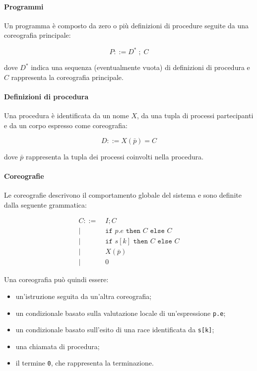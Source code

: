 \paragraph{Programmi}

Un programma è composto da zero o più definizioni di procedure seguite da una coreografia principale:

\[
P ::= D^{*} \; ; \; C
\]

dove \(D^{*}\) indica una sequenza (eventualmente vuota) di definizioni di procedura e \(C\) rappresenta la coreografia principale.

\paragraph{Definizioni di procedura}

Una procedura è identificata da un nome \(X\), da una tupla di processi partecipanti e da un corpo espresso come coreografia:

\[
D ::= X(\bar{p}) = C
\]

dove \(\bar{p}\) rappresenta la tupla dei processi coinvolti nella procedura.

\paragraph{Coreografie}

Le coreografie descrivono il comportamento globale del sistema e sono definite dalla seguente grammatica:

\[
\begin{aligned}
C ::= \;& I ; C \\
  \mid\;& \texttt{if } p.e \texttt{ then } C \texttt{ else } C \\
  \mid\;& \texttt{if } s[k] \texttt{ then } C \texttt{ else } C \\
  \mid\;& X(\bar{p}) \\
  \mid\;& 0
\end{aligned}
\]

Una coreografia può quindi essere:

\begin{itemize}
\item un’istruzione seguita da un’altra coreografia;
\item un condizionale basato sulla valutazione locale di un’espressione \texttt{p.e};
\item un condizionale basato sull’esito di una race identificata da \texttt{s[k]};
\item una chiamata di procedura;
\item il termine \texttt{0}, che rappresenta la terminazione.
\end{itemize}

